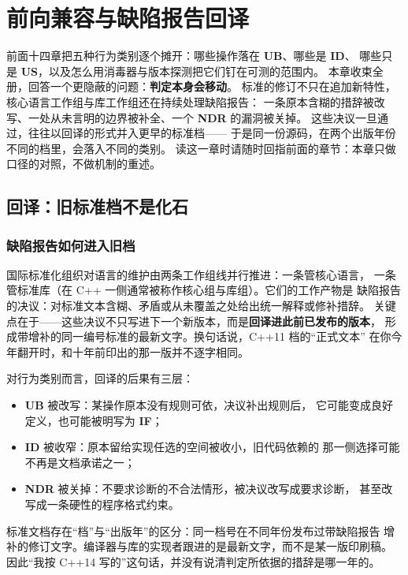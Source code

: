 \documentclass[12pt,a4paper,fontset=fandol]{ctexbook}
\newcommand{\cpp}[1]{C++#1}
\newcommand{\Lang}[1]{\textsf{#1}}
\newcommand{\CPP}{\Lang{C++}}
\newcommand{\UB}{\textbf{\textsf{UB}}}
\newcommand{\IDB}{\textbf{\textsf{ID}}}
\newcommand{\USB}{\textbf{\textsf{US}}}
\newcommand{\NDR}{\textbf{\textsf{NDR}}}
\newcommand{\ILLF}{\textbf{\textsf{IF}}}
\begin{document}
\chapter{前向兼容与缺陷报告回译}\label{ch:ub15-forward}

前面十四章把五种行为类别逐个摊开：哪些操作落在 \UB{}、哪些是 \IDB{}、
哪些只是 \USB{}，以及怎么用消毒器与版本探测把它们钉在可测的范围内。
本章收束全册，回答一个更隐蔽的问题：\textbf{判定本身会移动}。
标准的修订不只在追加新特性，核心语言工作组与库工作组还在持续处理缺陷报告：
一条原本含糊的措辞被改写、一处从未言明的边界被补全、一个 \NDR{} 的漏洞被关掉。
这些决议一旦通过，往往以回译的形式并入更早的标准档——
于是同一份源码，在两个出版年份不同的档里，会落入不同的类别。
读这一章时请随时回指前面的章节：本章只做口径的对照，不做机制的重述。

\section{回译：旧标准档不是化石}

\subsection{缺陷报告如何进入旧档}

国际标准化组织对语言的维护由两条工作组线并行推进：一条管核心语言，
一条管标准库（在 \CPP{} 一侧通常被称作核心组与库组）。它们的工作产物是
缺陷报告的决议：对标准文本含糊、矛盾或从未覆盖之处给出统一解释或修补措辞。
关键点在于——这些决议不只写进下一个新版本，而是\textbf{回译进此前已发布的版本}，
形成带增补的同一编号标准的最新文字。换句话说，\cpp{11} 档的“正式文本”
在你今年翻开时，和十年前印出的那一版并不逐字相同。

对行为类别而言，回译的后果有三层：

\begin{itemize}
  \item \UB{} 被改写：某操作原本没有规则可依，决议补出规则后，
        它可能变成良好定义，也可能被明写为 \ILLF{}；
  \item \IDB{} 被收窄：原本留给实现任选的空间被收小，旧代码依赖的
        那一侧选择可能不再是文档承诺之一；
  \item \NDR{} 被关掉：不要求诊断的不合法情形，被决议改写成要求诊断，
        甚至改写成一条硬性的程序格式约束。
\end{itemize}

\begin{clause}[title=标准的活体属性]
标准文档存在“档”与“出版年”的区分：同一档号在不同年份发布过带缺陷报告
增补的修订文字。编译器与库的实现者跟进的是最新文字，而不是某一版印刷稿。
因此“我按 \cpp{14} 写的”这句话，并没有说清判定所依据的措辞是哪一年的。
\end{clause}
\end{document}
